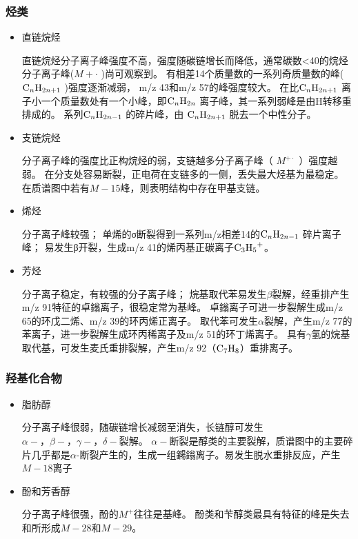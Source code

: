 \subsubsection*{烃类}
\begin{itemize}
    \item 直链烷烃
    
    直链烷烃分子离子峰强度不高，强度随碳链增长而降低，通常碳数<40的烷烃分子离子峰($M+\cdot$ )尚可观察到。
    有相差14个质量数的一系列奇质量数的峰($\ce{C_{n}H_{2n+1}}$ )强度逐渐减弱， m/z 43和m/z 57的峰强度较大。
    在比$\ce{C_{n}H_{2n+1}}$ 离子小一个质量数处有一个小峰，即$\ce{C_{n}H_{2n}}$ 离子峰，其一系列弱峰是由H转移重排成的。
    系列$\ce{C_{n}H_{2n-1}}$ 的碎片峰，由 $\ce{C_{n}H_{2n+1}}$ 脱去一个中性分子。
    \item 支链烷烃
    
    分子离子峰的强度比正构烷烃的弱，支链越多分子离子峰（ $M^{+\cdot}$ ）强度越弱。
    在分支处容易断裂，正电荷在支链多的一侧，丢失最大烃基为最稳定。在质谱图中若有$M-15$峰，则表明结构中存在甲基支链。
    \item 烯烃
    
    分子离子峰较强；
    单烯的σ断裂得到一系列m/z相差14的$\ce{C_{n}H_{2n-1}}$ 碎片离子峰；
    易发生β开裂，生成m/z 41的烯丙基正碳离子$\ce{C_{3}H_{5}^{+}}$。
    \item 芳烃
    
    分子离子稳定，有较强的分子离子峰；
    烷基取代苯易发生$\beta$裂解，经重排产生m/z 91特征的卓鎓离子，很稳定常为基峰。
    卓鎓离子可进一步裂解生成m/z 65的环戊二烯、m/z 39的环丙烯正离子。
    取代苯可发生$\alpha$裂解，产生m/z 77的苯离子，进一步裂解生成环丙稀离子及m/z 51的环丁烯离子。
    具有$\gamma$氢的烷基取代基，可发生麦氏重排裂解，产生m/z 92（$\ce{C_{7}H_{8}}$）重排离子。
\end{itemize}

\subsubsection*{ 羟基化合物}
\begin{itemize}
    \item 脂肪醇

    分子离子峰很弱，随碳链增长减弱至消失，长链醇可发生$\alpha-，\beta-，\gamma-，\delta-$裂解。
    $\alpha-$断裂是醇类的主要裂解，质谱图中的主要碎片几乎都是$\alpha$-断裂产生的，生成一组鐊鎓离子。易发生脱水重排反应，产生$M-18$离子
    \item 酚和芳香醇
    
    分子离子峰很强，酚的$M^{+}$往往是基峰。
酚类和苄醇类最具有特征的峰是失去和所形成$M-28$和$M-29$。
\end{itemize}


